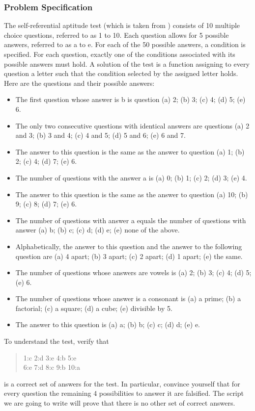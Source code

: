 \documentclass[a4paper]{scrartcl}
\begin{document}
\subsubsection{Problem Specification}
The self-referential aptitude test (which is taken from \cite{10}) 
consists of 10 multiple choice questions, referred to as 1 to 10. 
Each question allows for 5 possible answers, referred to as a to e. 
For each of the 50 possible answers, a condition is specified. 
For each question, exactly one of the conditions associated with 
its possible answers must hold. A solution of the test is a function 
assigning to every question a letter such that the condition selected 
by the assigned letter holds.\\
Here are the questions and their possible answers:
\begin{itemize}
\item
The first question whose answer is b is question 
(a) 2; (b) 3; (c) 4; (d) 5; (e) 6.
\item
The only two consecutive questions with identical answers are questions 
(a) 2 and 3; (b) 3 and 4; (c) 4 and 5; (d) 5 and 6; (e) 6 and 7.
\item
The answer to this question is the same as the answer to question 
(a) 1; (b) 2; (c) 4; (d) 7; (e) 6.
\item
The number of questions with the answer a is (a) 0; (b) 1; (c) 2; (d) 3; (e) 4.
\item
The answer to this question is the same as the answer to question 
(a) 10; (b) 9; (c) 8; (d) 7; (e) 6.
\item
The number of questions with answer a equals the number of questions 
with answer (a) b; (b) c; (c) d; (d) e; (e) none of the above.
\item
Alphabetically, the answer to this question and the answer to the 
following question are (a) 4 apart; (b) 3 apart; (c) 2 apart; 
(d) 1 apart; (e) the same.
\item
The number of questions whose answers are vowels is (a) 2; (b) 3; 
(c) 4; (d) 5; (e) 6.
\item
The number of questions whose answer is a consonant is (a) a prime; 
(b) a factorial; (c) a square; (d) a cube; (e) divisible by 5.
\item
The answer to this question is (a) a; (b) b; (c) c; (d) d; (e) e.
\end{itemize}
To understand the test, verify that
\begin{quote}
1:c  \hspace{2mm} 2:d \hspace{2mm} 3:e \hspace{2mm} 4:b \hspace{2mm}5:e\\
6:e \hspace{2mm} 7:d \hspace{2mm} 8:c \hspace{2mm} 9:b \hspace{2mm} 10:a
\end{quote}
is a correct set of answers for the test. In particular, convince 
yourself that for every question the remaining 4 possibilities to 
answer it are falsified. The script we are going to write will 
prove that there is no other set of correct answers.
\end{document}
